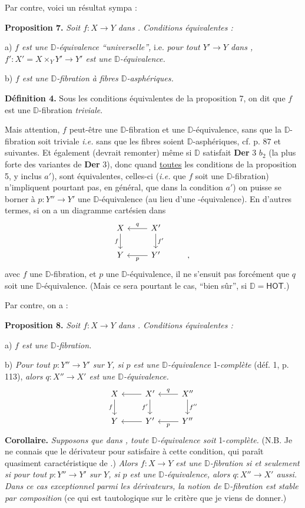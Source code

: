 \documentclass[11pt,leqno]{article}
\newcommand{\msp}[1]{\marginpar{\footnotesize [#1]}}
\newcommand{\Dia}{\mathsf{Dia}}
\newcommand{\Hot}{\mathsf{Hot}}
\newcommand{\HOT}{\mathsf{HOT}}
\newcommand{\D}{\mathbb{D}}
\begin{document}
Par contre, voici un résultat sympa :

\msp{page 119}\textbf{Proposition 7.} \textit{Soit $f : X \to Y$ dans \Dia. Conditions équivalentes :}

a) \textit{$f$ est une $\D$-équivalence “universelle”,} i.e. \textit{pour tout $Y' \to Y$ dans \Dia, $f' : X' = X \times_Y Y' \to Y'$ est une $\D$-équivalence.}

b) \textit{$f$ est une $\D$-fibration à fibres $\D$-asphériques.}

\textbf{Définition 4.} Sous les conditions équivalentes de la proposition 7, on dit que $f$ est une $\D$-fibration \textit{triviale}.

Mais attention, $f$ peut-être une $\D$-fibration et une $\D$-équivalence, sans que la $\D$-fibration soit triviale \textit{i.e.} sans que les fibres soient $\D$-asphériques, cf. p. 87 et suivantes. %
Et également (devrait remonter) même si $\D$ satisfait \textbf{Der} 3 $b_2$ (la plus forte des variantes de \textbf{Der} 3), donc quand \underline{toutes} les conditions de la proposition 5, y inclus $a'$), sont équivalentes, celles-ci (\textit{i.e.} que $f$ soit une $\D$-fibration) n'impliquent pourtant pas, en général, que dans la condition $a'$) on puisse se borner à $p : Y'' \to Y'$ une $\D$-équivalence (au lieu d'une \Hot-équivalence). En d'autres termes, si on a un diagramme cartésien dans \Dia
\[
\begin{tikzcd}
X \arrow[d, "f"'] & X' \arrow[l, "q"'] \arrow[d, "f'"] \\
Y & Y' \arrow[l, "p"] & ,
\end{tikzcd}
\]
avec $f$ une $\D$-fibration, et $p$ une $\D$-équivalence, il ne s'ensuit pas forcément que $q$ soit une $\D$-équivalence. (Mais ce sera pourtant le cas, “bien sûr”, si $\D = \HOT$.)

\msp{page 120}Par contre, on a :

\textbf{Proposition 8.} \textit{Soit $f : X \to Y$ dans \Dia. Conditions équivalentes :}

a) \textit{$f$ est une $\D$-fibration.}

b) \textit{Pour tout $p : Y'' \to Y'$ sur $Y$, si $p$ est une $\D$-équivalence} 1-\textit{complète} (déf. 1, p. 113), \textit{alors $q : X'' \to X'$ est une $\D$-équivalence.}
\[
\begin{tikzcd}
X \arrow[d, "f"'] & X' \arrow[l] \arrow[d, "f'"'] & X'' \arrow[l, "q"'] \arrow[d, "f''"] \\
Y & Y' \arrow[l] & Y'' \arrow[l, "p"]
\end{tikzcd}
\]
\textbf{Corollaire.} \textit{Supposons que dans \Dia, toute $\D$-équivalence soit} 1-\textit{complète.} (N.B. Je ne connais que le dérivateur \HOT{} pour satisfaire à cette condition, qui paraît quasiment caractéristique de \HOT.) \textit{Alors $f : X \to Y$ est une $\D$-fibration si et seulement si pour tout $p : Y'' \to Y'$ sur $Y$, si $p$ est une $\D$-équivalence, alors $q : X'' \to X'$ aussi. Dans ce cas exceptionnel parmi les dérivateurs, la notion de $\D$-fibration est stable par composition} (ce qui est tautologique sur le critère que je viens de donner.)
\end{document}
